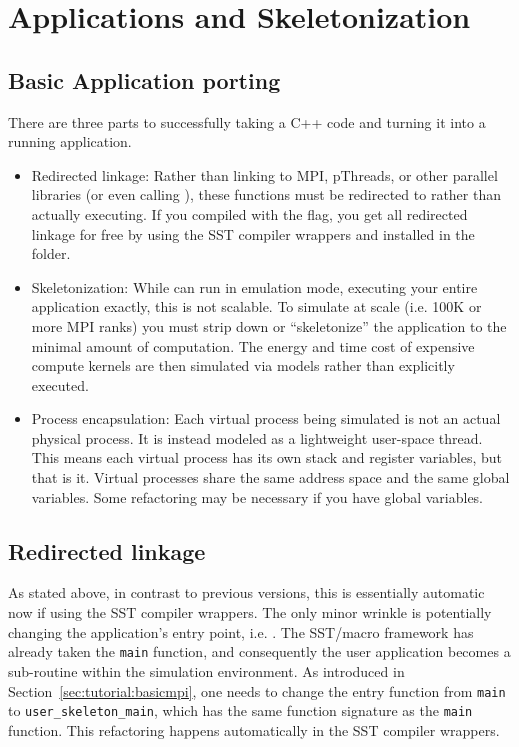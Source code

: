 
\chapter{Applications and Skeletonization}
\label{sec:skeletonization}

\section{Basic Application porting}
\label{sec:skel:basic}
There are three parts to successfully taking a C++ code and turning it into a running application.
\begin{itemize}
\item Redirected linkage: Rather than linking to MPI, pThreads, or other parallel libraries (or even calling ), these functions must be redirected to \sstmacro rather than actually executing.
If you compiled with the  flag, you get all redirected linkage for free by using
the SST compiler wrappers  and  installed in the  folder.
\item Skeletonization: While \sstmacro can run in emulation mode, executing your entire application exactly, this is not scalable.  To simulate at scale (i.e. 100K or more MPI ranks) you must strip down or ``skeletonize'' the application to the minimal amount of computation.  The energy and time cost of expensive compute kernels are then simulated via models rather than explicitly executed. 

\item Process encapsulation: Each virtual process being simulated is not an actual physical process. It is instead modeled as a lightweight user-space thread.  This means each virtual process has its own stack and register variables, but that is it.
Virtual processes share the same address space and the same global variables.  Some refactoring may be necessary if you have global variables.

\end{itemize}

\section{Redirected linkage}
\label{sec:skel:linkage}
As stated above, in contrast to previous versions, this is essentially automatic now if using the SST compiler wrappers.
The only minor wrinkle is potentially changing the application's entry point, i.e. .
The SST/macro framework has already taken the \texttt{main} function, and consequently the user application becomes a sub-routine within the simulation environment. As introduced in Section~\ref{sec:tutorial:basicmpi}, one needs to change the entry function from \texttt{main} to \texttt{user\_skeleton\_main}, which has the same function signature as the \texttt{main} function.  This refactoring happens automatically in the SST compiler wrappers. 

